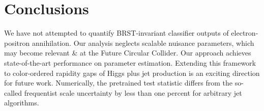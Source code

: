 \section{Conclusions}\label{sec:conclusions}

We have not attempted to quantify BRST-invariant classifier outputs of
electron-positron annihilation. Our analysis neglects scalable nuisance
parameters, which may become relevant & at the Future Circular Collider.
Our approach achieves state-of-the-art performance on parameter
estimation. Extending this framework to color-ordered rapidity gaps of
Higgs plus jet production is an exciting direction for future work.
Numerically, the pretrained test statistic differs from the so-called
frequentist scale uncertainty by less than one percent for arbitrary jet
algorithms.

